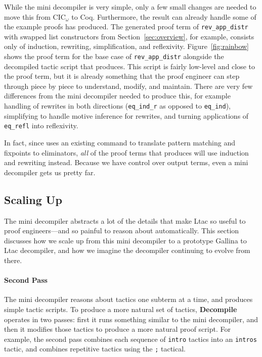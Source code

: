 While the mini decompiler is very simple, only a few small changes are needed
to move this from CIC$_{\omega}$ to Coq.
Furthermore, the result can already handle some of the example proofs \toolname has produced.
The generated proof term of \lstinline{rev_app_distr} with swapped list constructors from Section~\ref{sec:overview},
for example, consists only of induction, rewriting, simplification, and reflexivity.
Figure~\ref{fig:rainbow} shows the proof term for the base case of \lstinline{rev_app_distr} 
alongside the decompiled tactic script that \toolname produces.
This script is fairly low-level and close to the proof term, but it is already something that the proof engineer
can step through piece by piece to understand, modify, and maintain.
There are very few differences from the mini decompiler needed to produce this,
for example handling of rewrites in both directions (\lstinline{eq_ind_r} as opposed to \lstinline{eq_ind}),
simplifying to handle motive inference for rewrites,
and turning applications of \lstinline{eq_refl} into reflexivity.

In fact, since \toolname uses an existing command to translate pattern matching and fixpoints to eliminators,
\textit{all} of the proof terms that \toolname produces will use induction and rewriting instead.
Because we have control over output terms, even a mini decompiler gets us pretty far.


\subsection{Scaling Up}
\label{sec:second}

The mini decompiler abstracts a lot of the details that make Ltac so useful to proof engineers---and so painful to 
reason about automatically.
This section discusses how we scale up from this mini decompiler to a prototype Gallina to Ltac decompiler,
and how we imagine the decompiler continuing to evolve from there.

\paragraph{Second Pass}
The mini decompiler reasons about tactics one subterm at a time, and produces simple tactic scripts.
To produce a more natural set of tactics, \textbf{Decompile} operates in two passes: first it runs something similar to the mini decompiler, and then it modifies those tactics to produce a more natural proof script.
For example, the second pass combines each sequence of \lstinline{intro} tactics into an \lstinline{intros} tactic,
and combines repetitive tactics using the \lstinline{;} tactical.

